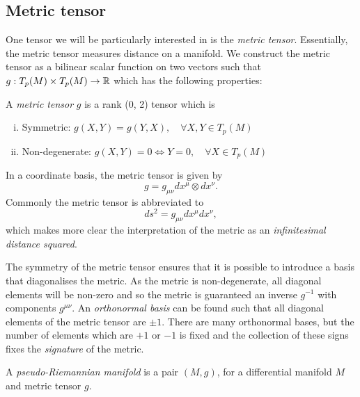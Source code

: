 \subsection{Metric tensor}
\label{sec:metrictensor}
One tensor we will be particularly interested in is the \emph{metric tensor}. Essentially, the metric tensor measures distance on a manifold. We construct the metric tensor as a bilinear scalar function on two vectors such that $g: T_p(M) \times T_p(M) \rightarrow {\mathbb{R}}$ which has the following properties:
\begin{defn}
	A \emph{metric tensor} $g$ is a rank (0, 2) tensor which is
	\begin{enumerate}[(i)]
		\item Symmetric: $g(X,Y) = g(Y,X), \quad \forall X,Y \in T_p(M)$
		\item Non-degenerate: $g(X,Y) = 0 \Leftrightarrow Y = 0, \quad \forall X \in T_p(M)$
	\end{enumerate}
\end{defn}
In a coordinate basis, the metric tensor is given by
\begin{equation*}
	g = g_{\mu \nu} dx^\mu \otimes dx^\nu.
\end{equation*}
Commonly the metric tensor is abbreviated to
\begin{equation*}
	ds^2 =  g_{\mu \nu} dx^\mu dx^\nu,
\end{equation*} 
which makes more clear the interpretation of the metric as an \emph{infinitesimal distance squared}. 

The symmetry of the metric tensor ensures that it is possible to introduce a basis that diagonalises the metric. As the metric is non-degenerate, all diagonal elements will be non-zero and so the metric is guaranteed an inverse $g^{-1}$ with components $g^{\mu \nu}$. An \emph{orthonormal basis} can be found such that all diagonal elements of the metric tensor are $\pm 1$. There are many orthonormal bases, but the number of elements which are $+1$ or $-1$ is fixed and the collection of these signs fixes the \emph{signature} of the metric. 

\begin{defn}
	A \emph{pseudo-Riemannian manifold} is a pair $(M, g)$, for a differential manifold $M$ and metric tensor $g$.
\end{defn}

